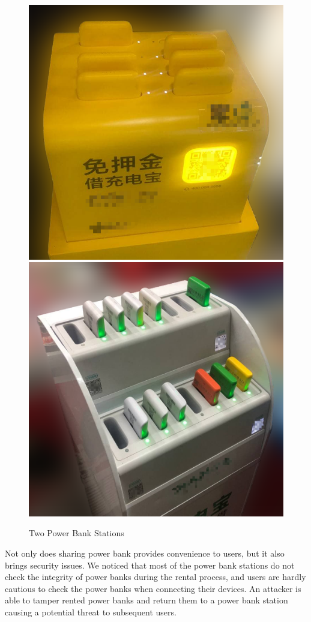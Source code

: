 \begin{figure}[t]
	\centering
	\includegraphics[width=.45 \linewidth, height=.45 \linewidth]{./Figs/PBS_mt.png}
	\includegraphics[width=.45 \linewidth, height=.45 \linewidth]{./Figs/PBS_xd.png}
	\caption{Two Power Bank Stations}
	\label{fig:PBS_products}
\end{figure}



Not only does sharing power bank provides convenience to users, but it also
brings security issues.  We noticed that most of the power bank stations do not
check the integrity of power banks during the rental process, and users are
hardly cautious to check the power banks when connecting their devices.  An
attacker is able to tamper rented power banks and return them to a power bank
station causing a potential threat to subsequent users.


